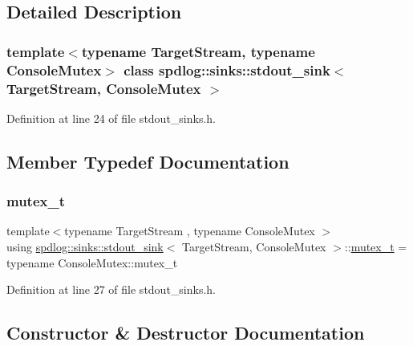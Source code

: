 \subsection{Detailed Description}
\subsubsection*{template$<$typename Target\+Stream, typename Console\+Mutex$>$\newline
class spdlog\+::sinks\+::stdout\+\_\+sink$<$ Target\+Stream, Console\+Mutex $>$}



Definition at line 24 of file stdout\+\_\+sinks.\+h.



\subsection{Member Typedef Documentation}
\mbox{\label{classspdlog_1_1sinks_1_1stdout__sink_a8546278774f901c3b5159876154e2eea}} 
\subsubsection{\texorpdfstring{mutex\+\_\+t}{mutex\_t}}
{\footnotesize\ttfamily template$<$typename Target\+Stream , typename Console\+Mutex $>$ \\
using \hyperlink{classspdlog_1_1sinks_1_1stdout__sink}{spdlog\+::sinks\+::stdout\+\_\+sink}$<$ Target\+Stream, Console\+Mutex $>$\+::\hyperlink{classspdlog_1_1sinks_1_1stdout__sink_a8546278774f901c3b5159876154e2eea}{mutex\+\_\+t} =  typename Console\+Mutex\+::mutex\+\_\+t}



Definition at line 27 of file stdout\+\_\+sinks.\+h.



\subsection{Constructor \& Destructor Documentation}
\mbox{\label{classspdlog_1_1sinks_1_1stdout__sink_aadb52e8ba9e2992f847c46ec521b4407}} 
